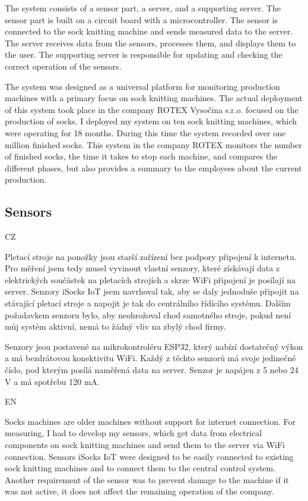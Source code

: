 \documentclass[12pt, a4paper]{article}
\begin{document}
The system consists of a sensor part, a server, and a supporting server.
The sensor part is built on a circuit board with a microcontroller.
The sensor is connected to the sock knitting machine and sends measured data to the server.
The server receives data from the sensors, processes them, and displays them to the user.
The supporting server is responsible for updating and checking the correct operation of the sensors.

The system was designed as a universal platform for monitoring production machines with a primary focus on sock knitting machines.
The actual deployment of this system took place in the company ROTEX Vysočina s.r.o. focused on the production of socks.
I deployed my system on ten sock knitting machines, which were operating for 18 months.
During this time the system recorded over one million finished socks.
This system in the company ROTEX monitors the number of finished socks, the time it takes to stop each machine, and compares the different phases, but also provides a summary to the employees about the current production.


\subsection*{Sensors}
CZ

Pletací stroje na ponožky jsou starší zařízení bez podpory připojení k internetu.
Pro měření jsem tedy musel vyvinout vlastní  senzory, které získávají data z elektrických součástek na pletacích  strojích a skrze WiFi připojení je posílají  na server.
Senzory iSocks IoT jsem navrhoval tak, aby se daly jednoduše připojit na stávající pletací stroje a napojit je tak do centrálního řídícího systému.
Dalším požadavkem senzoru bylo, aby neohrožoval chod samotného stroje, pokud není můj systém aktivní, nemá to žádný vliv na zbylý chod firmy.

Senzory jsou postavené na mikrokontroléru ESP32, který nabízí dostatečný výkon a má bezdrátovou konektivitu WiFi.
Každý z těchto senzorů má svoje jedinečné číslo, pod kterým posílá naměřená data na server.
Senzor je napájen z 5 nebo 24 V a má spotřebu 120 mA.

EN

Socks machines are older machines without support for internet connection.
For measuring, I had to develop my sensors, which get data from electrical components on sock knitting machines and send them to the server via WiFi connection.
Sensors iSocks IoT were designed to be easily connected to existing sock knitting machines and to connect them to the central control system.
Another requirement of the sensor was to prevent damage to the machine if it was not active, it does not affect the remaining operation of the company.
\end{document}
